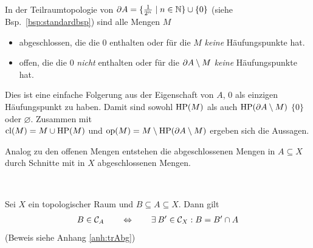    \begin{bsp}\ \\
        In der Teilraumtopologie von ${\partial A = \{\frac{1}{2^n} \mid n \in \mathbb{N}\} \cup \{0\}}$ (siehe Bsp.~\ref{bsp:standardbsp}) sind alle Mengen $M$ 
        \begin{itemize}
            \item abgeschlossen, die die $0$ enthalten oder für die  $M$ \textit{keine} Häufungspunkte hat.
            \item offen, die die $0$ \textit{nicht} enthalten oder für die $\partial A \setminus M$ \textit{keine} Häufungspunkte hat.
        \end{itemize}
        Dies ist eine einfache Folgerung aus der Eigenschaft von $A$, $0$ als einzigen Häufungspunkt zu haben. 
        Damit sind sowohl ${\text{HP}(M)}$ als auch ${\text{HP}(\partial A \setminus M)}$ ${\{0\}}$ oder $\varnothing$.
        Zusammen mit \\
        ${\text{cl}(M) = M \cup \text{HP}(M)}$ und ${\text{op}(M) = M \setminus \text{HP}(\partial A \setminus M)}$ ergeben sich die Aussagen.
    \end{bsp}


    Analog zu den offenen Mengen entstehen die abgeschlossenen Mengen in $A \subseteq X$ durch Schnitte mit in $X$ abgeschlossenen Mengen.
    \begin{satz} \label{satz:trAbg}\ \vspace{8pt}

        \noindent
        Sei $X$ ein topologischer Raum und $B \subseteq A \subseteq X$. Dann gilt
        \begin{align*}
            B \in \mathcal{C}_A \quad \quad \Leftrightarrow \quad \quad \exists\: B' \in \mathcal{C}_X : B = B' \cap A 
        \end{align*}
        (Beweis siehe Anhang \ref{anh:trAbg})
        
    \end{satz}


